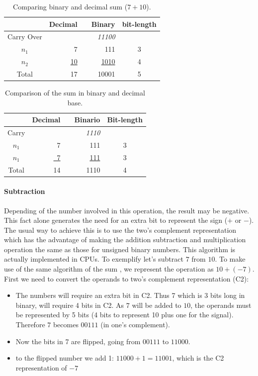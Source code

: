 \documentclass[12pt]{article}
\begin{document}
\begin{table}[ht]
	\centering
    \caption{Comparing binary and decimal sum ($7+10$).}
    \begin{tabular}{crrrc}
    \hline
    	  & Decimal & & Binary & bit-length \\
    \hline      
    Carry Over& 	& & \textit{11100} & \\
    $n_1$ & 7   & & 111 & 3 \\
    $n_2$ & \underline{10}	& & \underline{1010} & 4 \\
    Total & 17	& & 10001 & 5 \\
    \hline
	\end{tabular}
    \label{tab:01}
\end{table}
\begin{table}[ht]
    \centering
    \caption{Comparison of the sum in binary and decimal base.}
    \begin{tabular}{crrrc}
    \hline
    	  & Decimal & & Binario & Bit-length \\
    \hline      
    Carry & 	& & \textit{1110} & \\
    $n_1$ & 7   & & 111 & 3 \\
    $n_1$ & \underline{~7}	& & \underline{111} & 3 \\
    Total & 14	& & 1110 & 4 \\
    \hline
	\end{tabular}
    \label{tab:02}
\end{table}

\paragraph{Subtraction}

Depending of the number involved in this operation, the result may be negative.
This fact alone generates the need for an extra bit to represent the sign ($+$
or $-$). The usual way to achieve this is to use the  two's complement
\cite{flores1963logic} representation which has the advantage of making the
addition subtraction and multiplication operation the same as those for unsigned
binary numbers. This algorithm  is actually implemented in 
CPUs. To exemplify let's subtract $7$ from $10$. To make use of the
same algorithm of the sum , we represent the operation as $10+(-7)$. First we
need to convert the operands to two's complement representation (C2):

\begin{itemize}
    \item The numbers will require an extra bit in C2. Thus 7 which is 3
bits long in binary, will require 4 bits in C2. As $7$ will be added to $10$,
the operands must be represented by 5 bits (4 bits to represent 10 plus one for
the signal). Therefore $7$ becomes $00111$ (in one's complement).

    \item Now the bits in 7 are flipped, going from $00111$ to $11000$.

    \item to the flipped number we add 1: $11000+1=11001$, which is the C2
representation of $-7$
\end{itemize}
\end{document}

